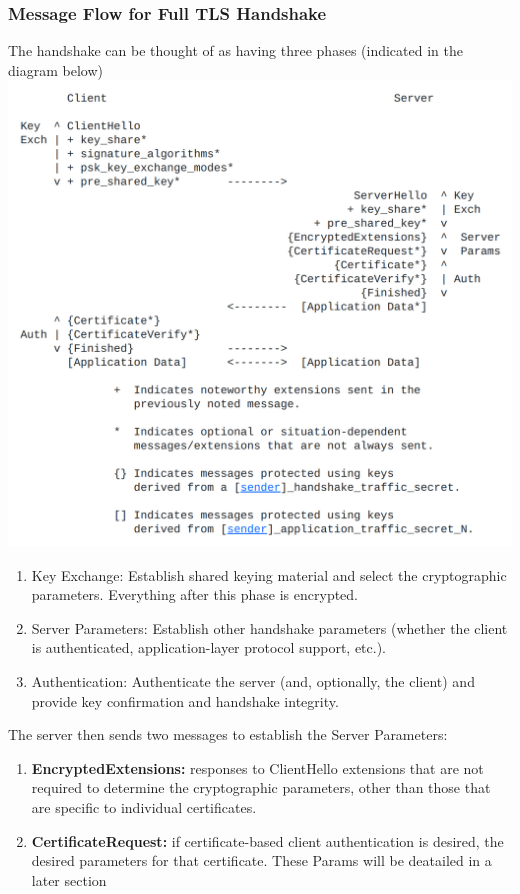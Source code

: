 \documentclass{article}
\begin{document}
   \subsubsection{Message Flow for Full TLS Handshake}
   \begin{center}
   The handshake can be thought of as having three phases (indicated in
   the diagram below)
       \includegraphics[width=1.1\columnwidth]{media/overview.png}
   \end{center}


    \begin{enumerate}
        \item Key Exchange: Establish shared keying material and select the
      cryptographic parameters.  Everything after this phase is
      encrypted.
      \item Server Parameters: Establish other handshake parameters
      (whether the client is authenticated, application-layer protocol
      support, etc.).
      \item Authentication: Authenticate the server (and, optionally, the
      client) and provide key confirmation and handshake integrity.
    \end{enumerate}


The server then sends two messages to establish the Server
   Parameters:
\begin{enumerate}
    \item \textbf{EncryptedExtensions:}  responses to ClientHello extensions that are
      not required to determine the cryptographic parameters, other than
      those that are specific to individual certificates.
    \item \textbf{CertificateRequest:}  if certificate-based client authentication is
      desired, the desired parameters for that certificate. These Params will be deatailed in a later section
\end{enumerate}
\end{document}
